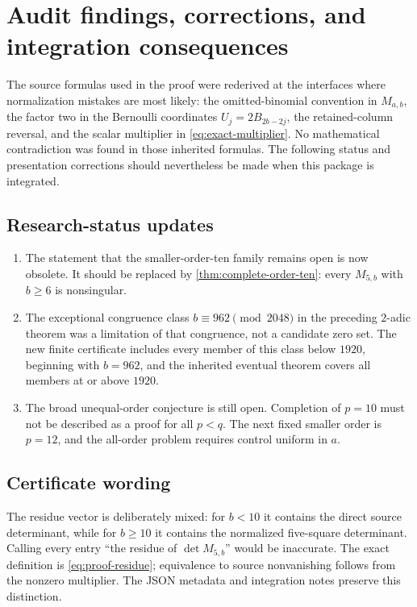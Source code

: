 \section{Audit findings, corrections, and integration consequences}
\label{sec:audit}

The source formulas used in the proof were rederived at the interfaces
where normalization mistakes are most likely: the omitted-binomial
convention in $M_{a,b}$, the factor two in the Bernoulli coordinates
$U_j=2B_{2b-2j}$, the retained-column reversal, and the scalar
multiplier in \eqref{eq:exact-multiplier}.  No mathematical
contradiction was found in those inherited formulas.  The following
status and presentation corrections should nevertheless be made when
this package is integrated.

\subsection{Research-status updates}

\begin{enumerate}[label=\textbf{A\arabic*.}]
\item The statement that the smaller-order-ten family remains open is
now obsolete.  It should be replaced by
\cref{thm:complete-order-ten}: every $M_{5,b}$ with $b\ge6$ is
nonsingular.

\item The exceptional congruence class
$b\equiv962\pmod{2048}$ in the preceding $2$-adic theorem was a
limitation of that congruence, not a candidate zero set.  The new finite
certificate includes every member of this class below $1920$, beginning
with $b=962$, and the inherited eventual theorem covers all members at
or above $1920$.

\item The broad unequal-order conjecture is still open.  Completion of
$p=10$ must not be described as a proof for all $p<q$.  The next fixed
smaller order is $p=12$, and the all-order problem requires control
uniform in $a$.
\end{enumerate}

\subsection{Certificate wording}

The residue vector is deliberately mixed: for $b<10$ it contains the
direct source determinant, while for $b\ge10$ it contains the normalized
five-square determinant.  Calling every entry ``the residue of
$\det M_{5,b}$'' would be inaccurate.  The exact definition is
\eqref{eq:proof-residue}; equivalence to source nonvanishing follows
from the nonzero multiplier.  The JSON metadata and integration notes
preserve this distinction.

